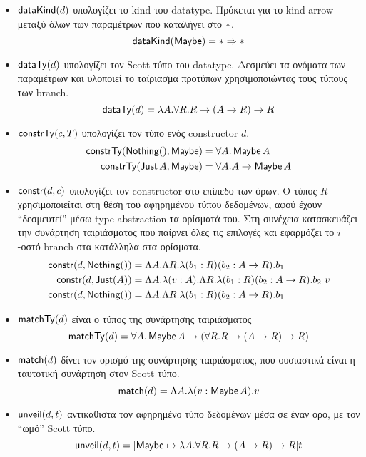 \begin{itemize}
\item $\mathsf{dataKind}(d)$ υπολογίζει το kind του datatype. Πρόκεται για το kind
  arrow μεταξύ όλων των παραμέτρων που καταλήγει στο $\operatorname{\ast}$.
  $$\mathsf{dataKind}(\operatorname{\textsf{Maybe}}) = \operatorname{\ast} \Rightarrow \operatorname{\ast}$$ \item $\mathsf{dataTy}(d)$ υπολογίζει
    τον Scott τύπο του datatype. Δεσμεύει τα ονόματα των παραμέτρων και
    υλοποιεί το ταίριασμα προτύπων χρησιμοποιώντας τους τύπους των branch.
  $$\mathsf{dataTy}(d) = \lambda A . \forall R . R \rightarrow (A \rightarrow R)
\rightarrow R$$ \item $\mathsf{constrTy}(c, T)$ υπολογίζει τον τύπο ενός constructor
  $d$.  \begin{align*} \mathsf{constrTy}(\operatorname{\textsf{Nothing}} (), \operatorname{\textsf{Maybe}}) &= \forall A . \operatorname{\textsf{Maybe}} A\\
  \mathsf{constrTy}(\operatorname{\textsf{Just}} A, \operatorname{\textsf{Maybe}}) &= \forall A . A \rightarrow \operatorname{\textsf{Maybe}} A \end{align*}
\item $\mathsf{constr}(d, c)$ υπολογίζει τον constructor στο επίπεδο των όρων. Ο τύπος
  $R$ χρησιμοποιείται στη θέση του αφηρημένου τύπου δεδομένων, αφού έχουν
  ``δεσμευτεί'' μέσω type abstraction τα ορίσματά του. Στη συνέχεια κατασκευάζει
  την συνάρτηση ταιριάσματος που παίρνει όλες τις επιλογές και εφαρμόζει το
  $i$-οστό branch στα κατάλληλα στα ορίσματα.  \begin{align*}
    \mathsf{constr}(d, \operatorname{\textsf{Nothing}} ()) &= \Lambda A . \Lambda R . \lambda (b_1 : R) (b_2 :
    A \rightarrow R) . b_1\\ \mathsf{constr}(d, \operatorname{\textsf{Just}} (A)) &= \Lambda A . \lambda (v :
    A) . \Lambda R . \lambda (b_1 : R) (b_2 : A \rightarrow R) . b_2\ v\\
    \mathsf{constr}(d, \operatorname{\textsf{Nothing}} ()) &= \Lambda A . \Lambda R . \lambda (b_1 : R) (b_2 :
    A \rightarrow R) . b_1 \end{align*} \item $\mathsf{matchTy}(d)$ είναι ο τύπος της
      συνάρτησης ταιριάσματος $$\mathsf{matchTy}(d) = \forall A . \operatorname{\textsf{Maybe}} A \rightarrow
      (\forall R . R \rightarrow (A \rightarrow R) \rightarrow R)$$ \item
        $\mathsf{match}(d)$ δίνει τον ορισμό της συνάρτησης ταιριάσματος, που
        ουσιαστικά είναι η ταυτοτική συνάρτηση στον Scott τύπο.  $$\mathsf{match}(d) =
      \Lambda A . \lambda (v : \operatorname{\textsf{Maybe}} A) . v$$ \item $\mathsf{unveil}(d, t)$
        αντικαθιστά τον αφηρημένο τύπο δεδομένων μέσα σε έναν όρο, με τον
        ``ωμό'' Scott τύπο.  $$\mathsf{unveil}(d, t) = [\operatorname{\textsf{Maybe}} \mapsto \lambda A .
        \forall R . R \rightarrow (A \rightarrow R) \rightarrow R]t$$
\end{itemize}



